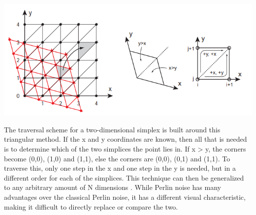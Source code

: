 \documentclass[10pt]{report}
\begin{document}
		\begin{minipage}{\textwidth}
			\centering
			\includegraphics[scale=.5]{skewed grid}
			\label{fig:fig9}
		\end{minipage}
		
		The traversal scheme for a two-dimensional simplex is built around this triangular method. If the x and y coordinates are known, then all that is needed is to determine which of the two simplices the point lies in. If x > y, the corners become (0,0), (1,0) and (1,1), else the corners are (0,0), (0,1) and (1,1). To traverse this, only one step in the x and one step in the y is needed, but in a different order for each of the simplices. This technique can then be generalized to any arbitrary amount of N dimensions \cite{simplex-demyst}. While Perlin noise has many advantages over the classical Perlin noise, it has a different visual characteristic, making it difficult to directly replace or compare the two. 
		
\end{document}
